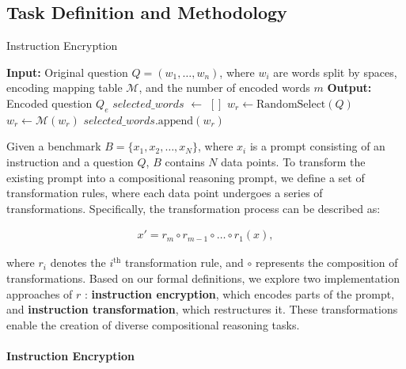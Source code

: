 \subsection{Task Definition and Methodology}
\begin{algorithm}[h!]
\caption{Instruction Encryption}
\label{alg:encode_question}
\begin{algorithmic}
\STATE \textbf{Input:} Original question $Q=(w_1,\dots,w_n)$, where \( w_i \) are words split by spaces, encoding mapping table $\mathcal{M}$, and the number of encoded words $m$
\STATE \textbf{Output:} Encoded question $Q_{e}$
\STATE $selected\_words$ $\gets$ $[]$
    \STATE $w_{r} \gets \text{RandomSelect}(Q)$
        \STATE $w_{r} \gets \mathcal{M}(w_{r}) $
        \STATE $selected\_words.\text{append}(w_{r})$
    \ENDIF
\ENDFOR
\end{algorithmic}
\end{algorithm}
Given a benchmark \( B = \{x_1, x_2, \dots, x_N\} \), where \( x_i \) is a prompt consisting of an instruction and a question \( Q \), \( B \) contains \( N \) data points.
To transform the existing prompt into a compositional reasoning prompt, we define a set of transformation rules, where each data point undergoes a series of transformations. 
Specifically, the transformation process can be described as:  

\begin{align}
x' = r_m \circ r_{m-1} \circ \dots \circ r_1(x),
\label{eq:composition}
\end{align}


where \( r_i \) denotes the \( i^{\text{th}} \) transformation rule, and \( \circ \) represents the composition of transformations.  
Based on our formal definitions, we explore two implementation approaches of  \( r \) : \textbf{instruction encryption}, which encodes parts of the prompt, and \textbf{instruction transformation}, which restructures it. 
These transformations enable the creation of diverse compositional reasoning tasks.


\paragraph{Instruction Encryption}

